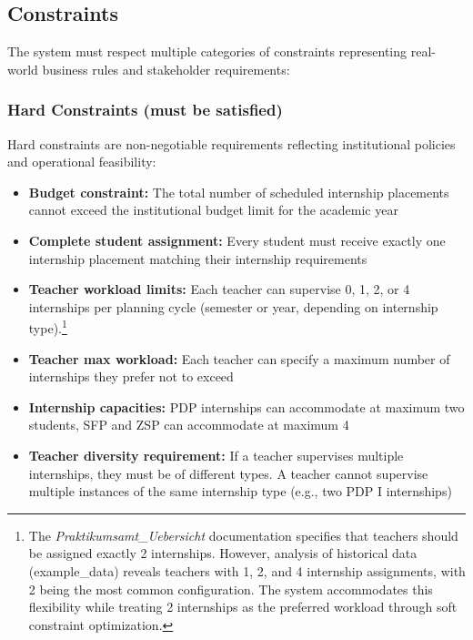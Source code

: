 \documentclass[12pt,a4paper]{report}
\begin{document}
\subsection{Constraints}

The system must respect multiple categories of constraints representing real-world business rules and stakeholder requirements:

\subsubsection{Hard Constraints (must be satisfied)}

Hard constraints are non-negotiable requirements reflecting institutional policies and operational feasibility:

\begin{itemize}
    \item \textbf{Budget constraint:} The total number of scheduled internship placements cannot exceed the institutional budget limit for the academic year
    
    \item \textbf{Complete student assignment:} Every student must receive exactly one internship placement matching their internship requirements 
    
    \item \textbf{Teacher workload limits:} Each teacher can supervise 0, 1, 2, or 4 internships per planning cycle (semester or year, depending on internship type).\footnote{The \textit{Praktikumsamt\_Uebersicht} documentation specifies that teachers should be assigned exactly 2 internships. However, analysis of historical data (example\_data) reveals teachers with 1, 2, and 4 internship assignments, with 2 being the most common configuration. The system accommodates this flexibility while treating 2 internships as the preferred workload through soft constraint optimization.}

    \item \textbf{Teacher max workload:} Each teacher can specify a maximum number of internships they prefer not to exceed

    \item \textbf{Internship capacities:} PDP internships can accommodate at maximum two students, SFP and ZSP can accommodate at maximum 4

    \item \textbf{Teacher diversity requirement:} If a teacher supervises multiple internships, they must be of different types. A teacher cannot supervise multiple instances of the same internship type (e.g., two PDP I internships)
    

\end{itemize}
\end{document}
